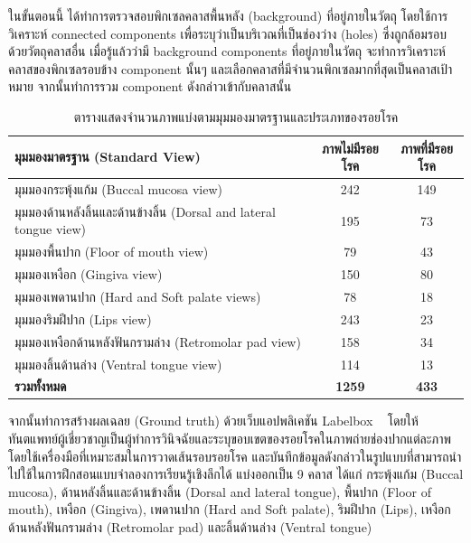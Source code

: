 ในขั้นตอนนี้ ได้ทำการตรวจสอบพิกเซลคลาสพื้นหลัง (background) ที่อยู่ภายในวัตถุ โดยใช้การวิเคราะห์ connected components เพื่อระบุว่าเป็นบริเวณที่เป็นช่องว่าง (holes) ซึ่งถูกล้อมรอบด้วยวัตถุคลาสอื่น
เมื่อรู้แล้วว่ามี background components ที่อยู่ภายในวัตถุ จะทำการวิเคราะห์คลาสของพิกเซลรอบข้าง component นั้นๆ และเลือกคลาสที่มีจำนวนพิกเซลมากที่สุดเป็นคลาสเป้าหมาย จากนั้นทำการรวม component ดังกล่าวเข้ากับคลาสนั้น





\begin{table}[htbp]
    \centering
    \caption{ตารางแสดงจำนวนภาพแบ่งตามมุมมองมาตรฐานและประเภทของรอยโรค}
    \label{tab:oral_lesion_data}
    \begin{tabular}{|l|c|c|}
        \hline
        \textbf{มุมมองมาตรฐาน (Standard View)} & \textbf{ภาพไม่มีรอยโรค} & \textbf{ภาพที่มีรอยโรค} \\ \hline
        มุมมองกระพุ้งแก้ม (Buccal mucosa view) & 242 & 149 \\ \hline
        มุมมองด้านหลังลิ้นและด้านข้างลิ้น (Dorsal and lateral tongue view) & 195 & 73 \\ \hline
        มุมมองพื้นปาก (Floor of mouth view) & 79 & 43 \\ \hline
        มุมมองเหงือก (Gingiva view) & 150 & 80 \\ \hline
        มุมมองเพดานปาก (Hard and Soft palate views) & 78 & 18 \\ \hline
        มุมมองริมฝีปาก (Lips view) & 243 & 23 \\ \hline
        มุมมองเหงือกด้านหลังฟันกรามล่าง (Retromolar pad view) & 158 & 34 \\ \hline
        มุมมองลิ้นด้านล่าง (Ventral tongue view) & 114 & 13 \\ \hline
        \textbf{รวมทั้งหมด} & \textbf{1259} & \textbf{433} \\ \hline
    \end{tabular}
\end{table}

จากนั้นทำการสร้างผลเฉลย (Ground truth) ด้วยเว็บแอปพลิเคชัน Labelbox ~\cite{labelbox} โดยให้ทันตแพทย์ผู้เชี่ยวชาญเป็นผู้ทำการวินิจฉัยและระบุขอบเขตของรอยโรคในภาพถ่ายช่องปากแต่ละภาพ โดยใช้เครื่องมือที่เหมาะสมในการวาดเส้นรอบรอยโรค และบันทึกข้อมูลดังกล่าวในรูปแบบที่สามารถนำไปใช้ในการฝึกสอนแบบจำลองการเรียนรู้เชิงลึกได้
แบ่งออกเป็น 9 คลาส ได้แก่ กระพุ้งแก้ม (Buccal mucosa), ด้านหลังลิ้นและด้านข้างลิ้น (Dorsal and lateral tongue), พื้นปาก (Floor of mouth), เหงือก (Gingiva), เพดานปาก (Hard and Soft palate), ริมฝีปาก (Lips), เหงือกด้านหลังฟันกรามล่าง (Retromolar pad) และลิ้นด้านล่าง (Ventral tongue)

